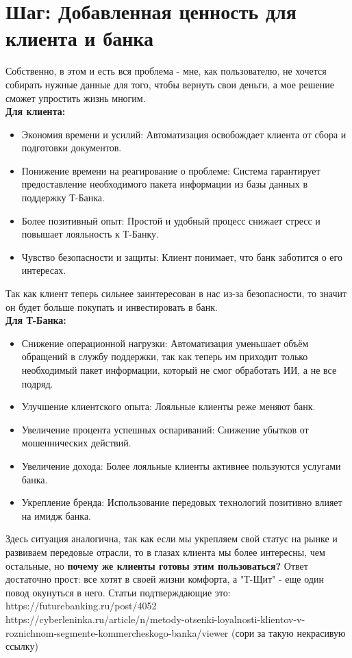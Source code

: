 \documentclass[12pt,a4paper]{article}
\begin{document}
\section{Шаг: Добавленная ценность для клиента и банка}
Собственно, в этом и есть вся проблема - мне, как пользователю, не хочется собирать нужные данные для того, чтобы вернуть свои деньги, а мое решение сможет упростить жизнь многим.\\
\textbf{Для клиента:}
\begin{itemize}
    \item Экономия времени и усилий: Автоматизация освобождает клиента от сбора и подготовки документов.
    \item Понижение времени на реагирование о проблеме: Система гарантирует предоставление необходимого пакета информации из базы данных в поддержку Т-Банка.
    \item Более позитивный опыт: Простой и удобный процесс снижает стресс и повышает лояльность к Т-Банку.
    \item Чувство безопасности и защиты: Клиент понимает, что банк заботится о его интересах. \\
\end{itemize}
Так как клиент теперь сильнее заинтересован в нас из-за безопасности, то значит он будет больше покупать и инвестировать в банк. \\
\textbf{Для Т-Банка:}
\begin{itemize}
    \item Снижение операционной нагрузки: Автоматизация уменьшает объём обращений в службу поддержки, так как теперь им приходит только необходимый пакет информации, который не смог обработать ИИ, а не все подряд.
    \item Улучшение клиентского опыта: Лояльные клиенты реже меняют банк.
    \item Увеличение процента успешных оспариваний: Снижение убытков от мошеннических действий.
    \item Увеличение дохода: Более лояльные клиенты активнее пользуются услугами банка.
    \item Укрепление бренда: Использование передовых технологий позитивно влияет на имидж банка.\\
\end{itemize}
Здесь ситуация аналогична, так как если мы укрепляем свой статус на рынке и развиваем передовые отрасли, то в глазах клиента мы более интересны, чем остальные, но \textbf{почему же клиенты готовы этим пользоваться?} Ответ достаточно прост: все хотят в своей жизни комфорта, а "Т-Щит" \vspace{} - еще один повод окунуться в него.
Статьи подтверждающие это:\\
https://futurebanking.ru/post/4052 \\
https://cyberleninka.ru/article/n/metody-otsenki-loyalnosti-klientov-v-roznichnom-segmente-kommercheskogo-banka/viewer (сори за такую некрасивую ссылку)\\
\end{document}
